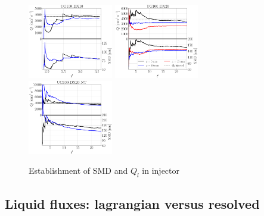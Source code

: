 \begin{figure}[ht]
   \includegraphics[width=0.33\textwidth]{./part2_developments/figures_ch5_resolved_JICF/SPRAY_characterization/establishment_and_fluxes/establishment_UG100_DX10}
   \hspace*{-0.1in}
   \includegraphics[width=0.33\textwidth]{./part2_developments/figures_ch5_resolved_JICF/SPRAY_characterization/establishment_and_fluxes/establishment_UG100_DX20}
   \hspace*{-0.1in}
   \includegraphics[width=0.33\textwidth]{./part2_developments/figures_ch5_resolved_JICF/SPRAY_characterization/establishment_and_fluxes/establishment_UG100_DX20_NT}
   \caption{Establishment of SMD and $Q_l$ in injector}
\label{fig:ch5_spray_char_establishment}
\end{figure}


\subsection{Liquid fluxes: lagrangian versus resolved}
\label{subsec:ch5_sli_fluxes_vs_IBs}

